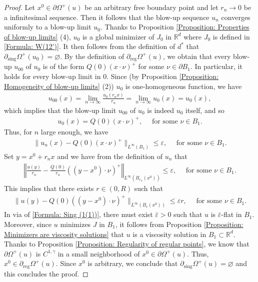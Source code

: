 \documentclass[11pt,reqno]{amsart}
\begin{document}
\begin{proof}
	Let $x^{0}\in\partial\varOmega^{+}(u)$ be an arbitrary free boundary point and let $r_{n}\to0$ be a infinitesimal sequence. Then it follows that the blow-up sequence $u_{n}$ converges uniformly to a blow-up limit $u_{0}$. Thanks to Proposition \ref{Proposition: Properties of blow-up limits} (4), $u_{0}$ is a global minimizer of $J_{0}$ in $\mathbb{R}^{d}$ where $J_{0}$ is defined in \eqref{Formula: W(12')}. It then follows from the definition of $d^{*}$ that $\partial_{\mathrm{sing}}\varOmega^{+}(u_{0})=\varnothing$. By the definition of $\partial_{\mathrm{reg}}\varOmega^{+}(u)$, we obtain that every blow-up $u_{00}$ of $u_{0}$ is of the form $Q(0)(x\cdot\nu)^{+}$ for some $\nu\in\partial B_{1}$. In particular, it holds for every blow-up limit in $0$. Since (by Proposition \ref{Proposition: Homogeneity of blow-up limits} (2)) $u_{0}$ is one-homogeneous function, we have
	\begin{align*}
		u_{00}(x)=\lim_{n\to\infty}\frac{u_{0}(r_{n}x)}{r_{n}}=\lim_{n\to\infty}u_{0}(x)=u_{0}(x),
	\end{align*}
	which implies that the blow-up limit $u_{00}$ of $u_{0}$ is indeed $u_{0}$ itself, and so
	\begin{align*}
		u_{0}(x)=Q(0)(x\cdot\nu)^{+},\quad\text{ for some }\nu\in B_{1}.
	\end{align*}
	Thus, for $n$ large enough, we have
	\begin{align*}
		\|u_{n}(x)-Q(0)(x\cdot\nu)^{+}\|_{L^{\infty}(B_{1})}\leqslant\varepsilon,\quad\text{ for some }\nu\in B_{1}.
	\end{align*}
	Set $y=x^{0}+r_{n}x$ and we have from the definition of $u_{n}$ that
	\begin{align*}
		\left\Vert\frac{u(y)}{r_{n}}-\frac{Q(0)}{r_{n}}((y-x^{0})\cdot\nu)^{+}\right\Vert_{L^{\infty}(B_{r_{n}}(x^{0}))}\leqslant\varepsilon,\quad\text{ for some }\nu\in B_{1}.
	\end{align*}
	This implies that there exists $r\in(0,R)$ such that
	\begin{align}\label{Formula: Sing (1(1))}
		\|u(y)-Q(0)((y-x^{0})\cdot\nu)^{+}\|_{L^{\infty}(B_{r}(x^{0}))}\leqslant\varepsilon r,\quad\text{ for some }\nu\in B_{1}.
	\end{align}
	In via of \eqref{Formula: Sing (1(1))}, there must exist $\bar{\varepsilon}>0$ such that $u$ is $\bar{\varepsilon}$-flat in $B_{1}$. Moreover, since $u$ minimizes $J$ in $B_{1}$, it follows from Proposition \ref{Proposition: Minimizers are viscosity solutions} that $u$ is a viscosity solution in $B_{1}\subset\mathbb{R}^{d}$. Thanks to Proposition \ref{Proposition: Regularity of regular points}, we know that $\partial\varOmega^{+}(u)$ is $C^{1,\gamma}$ in a small neighborhood of $x^{0}\in\partial\varOmega^{+}(u)$. Thus, $x^{0}\in\partial_{\mathrm{reg}}\varOmega^{+}(u)$. Since $x^{0}$ is arbitrary, we conclude that $\partial_{\mathrm{sing}}\varOmega^{+}(u)=\varnothing$ and this concludes the proof.
\end{proof}
\end{document}
